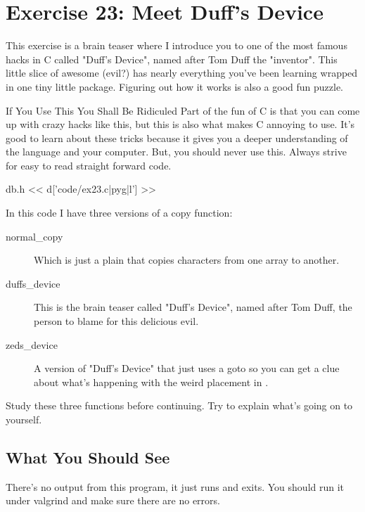 \chapter{Exercise 23: Meet Duff's Device}

This exercise is a brain teaser where I introduce you to one of the
most famous hacks in C called "Duff's Device", named after Tom Duff
the "inventor".  This little slice of awesome (evil?) has nearly everything
you've been learning wrapped in one tiny little package.  Figuring out
how it works is also a good fun puzzle.

\begin{aside}{If You Use This You Shall Be Ridiculed}
Part of the fun of C is that you can come up with crazy hacks like this,
but this is also what makes C annoying to use.  It's good to learn about
these tricks because it gives you a deeper understanding of
the language and your computer.  But, you should never use this.  Always
strive for easy to read straight forward code.
\end{aside}


\begin{code}{db.h}
<< d['code/ex23.c|pyg|l'] >>
\end{code}

In this code I have three versions of a copy function:

\begin{description}
\item[normal\_copy] Which is just a plain  that copies
    characters from one array to another.
\item[duffs\_device] This is the brain teaser called "Duff's Device", named
    after Tom Duff, the person to blame for this delicious evil.
\item[zeds\_device] A version of "Duff's Device" that just uses a goto so
    you can get a clue about what's happening with the weird 
    placement in .
\end{description}

Study these three functions before continuing.  Try to explain what's
going on to yourself.


\section{What You Should See}

There's no output from this program, it just runs and exits.  You should
run it under valgrind and make sure there are no errors.

